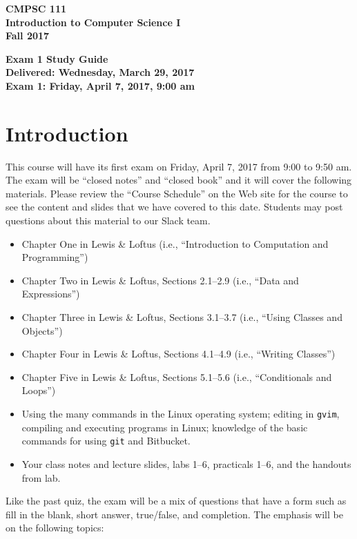\documentclass[11pt]{article}
\newcommand{\guidetitle}[1]
{
  \begin{center}
    \begin{center}
      \bf
      CMPSC 111\\Introduction to Computer Science I\\
      Fall 2017\\
      \medskip
    \end{center}
    \bf
    #1
  \end{center}
}
\begin{document}
\guidetitle{Exam 1 Study Guide \\ Delivered: Wednesday, March 29, 2017 \\ Exam 1: Friday, April 7, 2017, 9:00 am}

\section*{Introduction}

This course will have its first exam on Friday, April 7, 2017 from 9:00 to 9:50 am. The exam will be ``closed
notes'' and ``closed book'' and it will cover the following materials. Please review the ``Course Schedule'' on the Web
site for the course to see the content and slides that we have covered to this date. Students may post questions about
this material to our Slack team.

\begin{itemize}

  \itemsep 0in

  \item Chapter One in Lewis \& Loftus (i.e., ``Introduction to Computation and Programming'')

  \item Chapter Two in Lewis \& Loftus, Sections 2.1--2.9 (i.e., ``Data and Expressions'')

  \item Chapter Three in Lewis \& Loftus, Sections 3.1--3.7 (i.e., ``Using Classes and Objects'')

  \item Chapter Four in Lewis \& Loftus, Sections 4.1--4.9 (i.e., ``Writing Classes'')

  \item Chapter Five in Lewis \& Loftus, Sections 5.1--5.6 (i.e., ``Conditionals and Loops'')

  \item Using the many commands in the Linux operating system; editing in {\tt gvim}, compiling and executing
    programs in Linux; knowledge of the basic commands for using {\tt git} and Bitbucket.

  \item Your class notes and lecture slides, labs 1--6, practicals 1--6, and the handouts from lab.

\end{itemize}

\noindent Like the past quiz, the exam will be a mix of questions that have a form such as fill in the blank, short answer, true/false, and
completion. The emphasis will be on the following topics:
\end{document}
